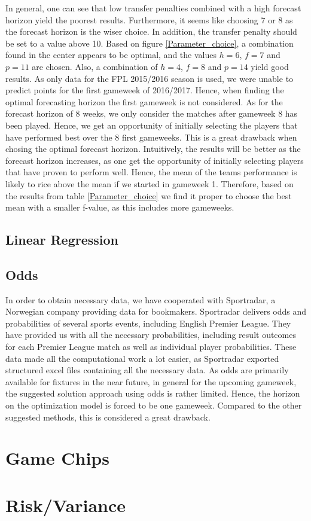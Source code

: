 In general, one can see that low transfer penalties combined with a high forecast horizon yield the poorest results. Furthermore, it seems like choosing 7 or 8 as the forecast horizon is the wiser choice. In addition, the transfer penalty should be set to a value above 10. Based on figure \ref{Parameter_choice}, a combination found in the center appears to be optimal, and the values $h = 6$, $f = 7$ and $p = 11$ are chosen. Also, a combination of $h = 4$, $f = 8$ and $p = 14$ yield good results. 
\newpar
As only data for the FPL 2015/2016 season is used, we were unable to predict points for the first gameweek of 2016/2017. Hence, when finding the optimal forecasting horizon the first gameweek is not considered. As for the forecast horizon of 8 weeks, we only consider the matches after gameweek 8 has been played. Hence, we get an opportunity of initially selecting the players that have performed best over the 8 first gameweeks. This is a great drawback when chosing the optimal forecast horizon. Intuitively, the results will be better as the forecast horizon increases, as one get the opportunity of initially selecting players that have proven to perform well. Hence, the mean of the teams performance is likely to rice above the mean if we started in gameweek 1. Therefore, based on the results from table \ref{Parameter_choice} we find it proper to choose the best mean with a smaller f-value, as this includes more gameweeks.  

\subsection{Linear Regression}
\subsection{Odds}
In order to obtain necessary data, we have cooperated with Sportradar, a Norwegian company providing data for bookmakers. Sportradar delivers odds and probabilities of several sports events, including English Premier League. They have provided us with all the necessary probabilities, including result outcomes for each Premier League match as well as individual player probabilities. These data made all the computational work a lot easier, as Sportradar exported structured excel files containing all the necessary data. 
\newpar
As odds are primarily available for fixtures in the near future, in general for the upcoming gameweek, the suggested solution approach using odds is rather limited. Hence, the horizon on the optimization model is forced to be one gameweek. Compared to the other suggested methods, this is considered a great drawback.
\section{Game Chips}
\section{Risk/Variance}


